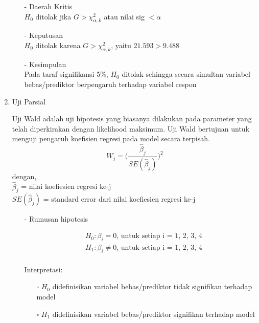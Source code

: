 \begin{enumerate}
\begin{test}
{\begin{enumerate}
        \item[-] Daerah Kritis \\
        $H_0$ ditolak jika $G > \chi_{\alpha, k}^2$ atau nilai sig $< \alpha$
    
        \item[-] Keputusan \\
        $H_0$ ditolak karena $G > \chi_{\alpha, k}^2$, yaitu $21.593 > 9.488$
    
        \item[-] Kesimpulan \\
        Pada taraf signifikansi 5\%, $H_0$ ditolak sehingga secara simultan variabel bebas/prediktor berpengaruh terhadap variabel respon
    \end{enumerate}
    }
    \end{test}
    
    \item Uji Parsial
    \begin{sloppypar}
        Uji Wald adalah uji hipotesis yang biasanya dilakukan pada parameter yang telah diperkirakan dengan likelihood maksimum. Uji Wald bertujuan untuk menguji pengaruh koefisien regresi pada model secara terpisah. $$W_j = \Bigg( \frac{\hat{\beta}_j}{SE(\hat{\beta}_j)} \Bigg)^2$$
        dengan, \\$\hat{\beta}_j$ = nilai koefiesien regresi ke-j \\$SE(\hat{\beta}_j)$ = standard error dari nilai koefiesien regresi ke-j
    \end{sloppypar}
    \begin{test}{
    \begin{enumerate}
        \item[-] Rumusan hipotesis \\
        \begin{fleqn}[\parindent]
            \begin{equation*}
            \begin{split}
            &H_0 : \beta_i = 0 \text{, untuk setiap i = 1, 2, 3, 4} \\ 
            &H_1 : \beta_i \neq 0 \text{, untuk setiap i = 1, 2, 3, 4} \\
            \end{split}
            \end{equation*}
        \end{fleqn}
        Interpretasi:
        \begin{enumerate}
        \item[$\square$] $H_0$ didefinisikan variabel bebas/prediktor tidak signifikan terhadap model
        \item[$\square$] $H_1$ didefinisikan variabel bebas/prediktor signifikan terhadap model
        \end{enumerate}
    

\end{enumerate}}
\end{test}
\end{enumerate}
